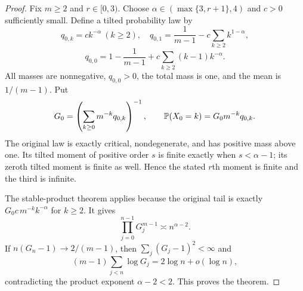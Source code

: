 \documentclass[11pt,letterpaper,reqno]{amsart}
\theoremstyle{plain}
\begin{document}
\begin{proof}
Fix $m\ge2$ and $r\in[0,3)$. Choose $\alpha\in(\max\{3,r+1\},4)$ and $c>0$ sufficiently small. Define a tilted probability law by
\[
 q_{0,k}=ck^{-\alpha}\ (k\ge2),\quad
 q_{0,1}=\frac1{m-1}-c\sum_{k\ge2}k^{1-\alpha},
\]
\[
 q_{0,0}=1-\frac1{m-1}+c\sum_{k\ge2}(k-1)k^{-\alpha}.
\]
All masses are nonnegative, $q_{0,0}>0$, the total mass is one, and the mean is $1/(m-1)$. Put
\[
 G_0=\left(\sum_{k\ge0}m^{-k}q_{0,k}\right)^{-1},\qquad
 \mathbb P(X_0=k)=G_0m^{-k}q_{0,k}.
\]
The original law is exactly critical, nondegenerate, and has positive mass above one. Its tilted moment of positive order $s$ is finite exactly when $s<\alpha-1$; its zeroth tilted moment is finite as well. Hence the stated $r$th moment is finite and the third is infinite.

The stable-product theorem applies because the original tail is exactly $G_0c\,m^{-k}k^{-\alpha}$ for $k\ge2$. It gives
\[
 \prod_{j=0}^{n-1}G_j^{m-1}\asymp n^{\alpha-2}.
\]
If $n(G_n-1)\to2/(m-1)$, then $\sum_j(G_j-1)^2<\infty$ and
\[
 (m-1)\sum_{j<n}\log G_j=2\log n+o(\log n),
\]
contradicting the product exponent $\alpha-2<2$. This proves the theorem.
\end{proof}
\end{document}
